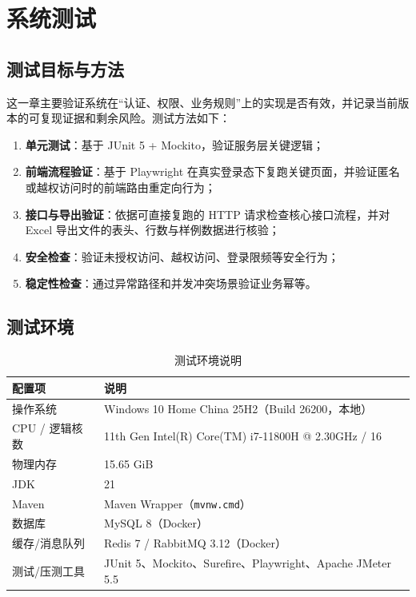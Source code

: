 ﻿%
\chapter{系统测试}
\sloppy
\hfuzz=200pt

\section{测试目标与方法}

这一章主要验证系统在“认证、权限、业务规则”上的实现是否有效，并记录当前版本的可复现证据和剩余风险。测试方法如下：
\begin{enumerate}
  \item \textbf{单元测试}：基于 JUnit 5 + Mockito，验证服务层关键逻辑；
  \item \textbf{前端流程验证}：基于 Playwright 在真实登录态下复跑关键页面，并验证匿名或越权访问时的前端路由重定向行为；
  \item \textbf{接口与导出验证}：依据可直接复跑的 HTTP 请求检查核心接口流程，并对 Excel 导出文件的表头、行数与样例数据进行核验；
  \item \textbf{安全检查}：验证未授权访问、越权访问、登录限频等安全行为；
  \item \textbf{稳定性检查}：通过异常路径和并发冲突场景验证业务幂等。
\end{enumerate}

\section{测试环境}

\begin{table}[H]
\centering
\caption{测试环境说明}
\label{tab:test-env}
\begin{tabular}{ll}
\toprule
配置项 & 说明 \\
\midrule
操作系统 & Windows 10 Home China 25H2（Build 26200，本地） \\
CPU / 逻辑核数 & 11th Gen Intel(R) Core(TM) i7-11800H @ 2.30GHz / 16 \\
物理内存 & 15.65 GiB \\
JDK & 21 \\
Maven & Maven Wrapper（\texttt{mvnw.cmd}） \\
数据库 & MySQL 8（Docker） \\
缓存/消息队列 & Redis 7 / RabbitMQ 3.12（Docker） \\
测试/压测工具 & JUnit 5、Mockito、Surefire、Playwright、Apache JMeter 5.5 \\
\bottomrule
\end{tabular}
\end{table}

